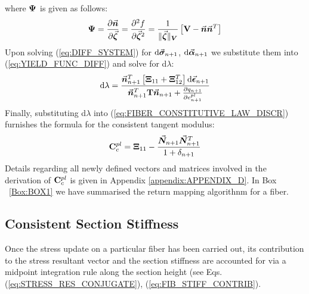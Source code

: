 \noindent where $\mathbf{\Psi}$ is given as follows:
\begin{equation}
	\mathbf{\Psi} = \frac{\partial\vec{\bm{n}}}{\partial \vec{\bm{\zeta}}}=
	\frac{\partial^2 f}{\partial \vec{\bm{\zeta}}^2} = \frac{1}{\Vert
		\vec{\bm{\zeta}}\Vert_{\bm{V}}}\left[ \mathbf{V}-\vec{\bm{n}}\vec{\bm{n}}^T\right]
	\label{eq:B}
\end{equation}
Upon solving (\ref{eq:DIFF_SYSTEM}) for $\text{d}\vec{\bm{\sigma}}_{n+1}$,
$\text{d}\vec{\bm{\alpha}}_{n+1}$ we substitute them into (\ref{eq:YIELD_FUNC_DIFF})
and solve for d$\lambda$:
\begin{equation}
	\text{d}\lambda =
	\frac{\vec{\bm{n}}_{n+1}^T\left[\mathbf{\Xi}_{11}+\mathbf{\Xi}_{12}^T\right]\text{d}\vec{\bm{\epsilon}}_{n+1}}{\vec{\bm{n}}_{n+1}^T\mathbf{T}\vec{\bm{n}}_{n+1}+
		\frac{\partial q_{n+1}}{\partial e_{n+1}^{pl}}}
	\label{eq:DE_GAMMA}
\end{equation}
Finally, substituting d$\lambda$ into (\ref{eq:FIBER_CONSTITUTIVE_LAW_DISCR}) 
furnishes the formula for the consistent tangent modulus:
\begin{equation}
	\mathbf{C}_c^{pl} = 
	\mathbf{\Xi}_{11}-\frac{\vec{\bm{N}}_{n+1}\vec{\bm{N}}_{n+1}^T}{1+\delta_{n+1}}
	\label{eq:CONSISTENT TANGENT MOD}
\end{equation}
Details regarding all newly defined vectors and matrices involved in the
derivation of $\mathbf{C}_c^{pl}$ is given in Appendix \ref{appendix:APPENDIX_D}. 
In Box ~\ref{Box:BOX1} 
we have summarised the return mapping algorithnm for a fiber.

\subsection{Consistent Section Stiffness}\label{section:CH3-S4SS3}

Once the stress update on a particular fiber has been carried out, its
contribution to the stress resultant vector and the section stiffness are
accounted for via a midpoint integration rule along the section height (see Eqs.
(\ref{eq:STRESS_RES_CONJUGATE}), (\ref{eq:FIB_STIFF_CONTRIB}).

